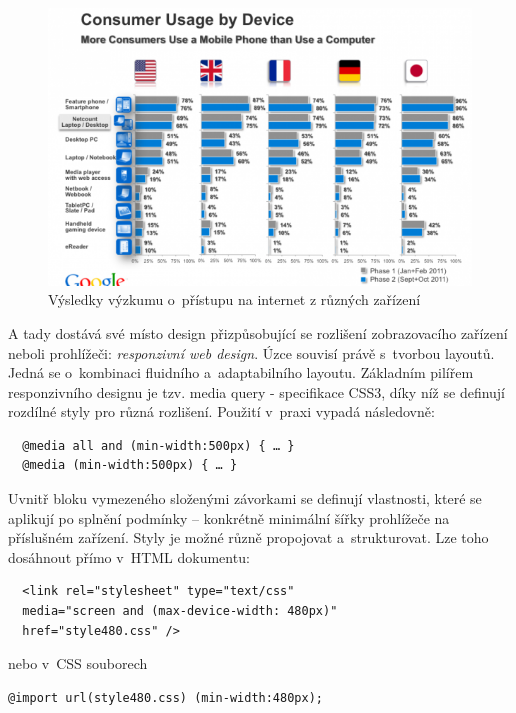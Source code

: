 \documentclass[thesis=B,czech]{FITthesis}[2012/06/26]
\begin{document}
\begin{figure}[h]
	\begin{center}
	\includegraphics[scale=0.7]{images/image01.png}
	\end{center}
	\caption{Výsledky výzkumu o~přístupu na internet z různých zařízení\cite{dev}}
	\label{imgStatG}
\end{figure}

A tady dostává své místo design přizpůsobující se rozlišení zobrazovacího zařízení neboli prohlížeči: \textit{responzivní web design}. Úzce souvisí právě s~tvorbou layoutů. Jedná se o~kombinaci fluidního a~adaptabilního layoutu. Základním pilířem responzivního designu je tzv. media query - specifikace CSS3, díky níž se definují rozdílné styly pro různá rozlišení. Použití v~praxi vypadá následovně:
\scriptsize
\begin{verbatim}
  @media all and (min-width:500px) { … }
  @media (min-width:500px) { … }
\end{verbatim}
\normalsize
Uvnitř bloku vymezeného složenými závorkami se definují vlastnosti, které se aplikují po splnění podmínky -- konkrétně minimální šířky prohlížeče na příslušném zařízení. Styly je možné různě propojovat a~strukturovat. Lze toho dosáhnout přímo v~HTML dokumentu:
\scriptsize
\begin{verbatim}
  <link rel="stylesheet" type="text/css"
  media="screen and (max-device-width: 480px)"
  href="style480.css" />
\end{verbatim}
\normalsize
nebo v~CSS souborech\cite{mq}
\scriptsize
\begin{verbatim}
@import url(style480.css) (min-width:480px);
\end{verbatim}
\normalsize
\end{document}

